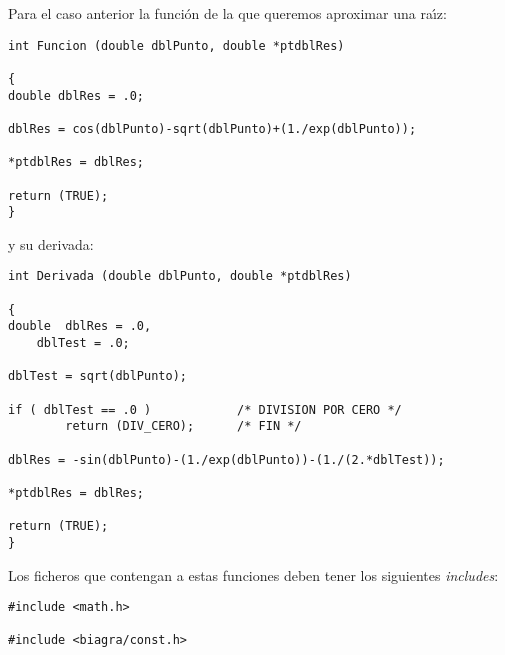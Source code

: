 Para el caso anterior la funci\'on de la que queremos aproximar una ra\'{\i}z:

\begin{verbatim}
int Funcion (double dblPunto, double *ptdblRes)

{
double dblRes = .0;

dblRes = cos(dblPunto)-sqrt(dblPunto)+(1./exp(dblPunto));

*ptdblRes = dblRes;

return (TRUE);
}
\end{verbatim}

y su derivada:

\begin{verbatim}
int Derivada (double dblPunto, double *ptdblRes)

{
double 	dblRes = .0,
	dblTest = .0;

dblTest = sqrt(dblPunto);

if ( dblTest == .0 )            /* DIVISION POR CERO */
        return (DIV_CERO);      /* FIN */

dblRes = -sin(dblPunto)-(1./exp(dblPunto))-(1./(2.*dblTest));

*ptdblRes = dblRes;

return (TRUE);
}
\end{verbatim}

Los ficheros que contengan a estas funciones deben tener los siguientes
\emph{includes}:

\begin{verbatim}
#include <math.h>

#include <biagra/const.h>
\end{verbatim}
